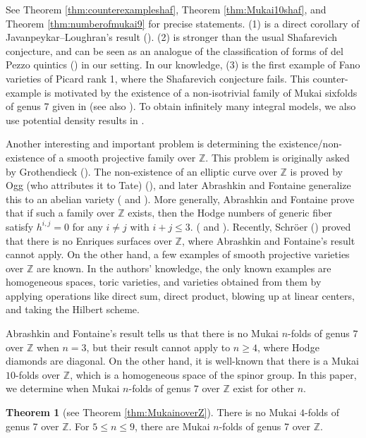 \documentclass[autodetect-engine, a4paper]{amsart}
\theoremstyle{definition}
\newtheorem{thm}{Theorem}[section]
\def\Z{{\mathbb Z}}
\begin{document}
See Theorem \ref{thm:counterexampleshaf}, Theorem \ref{thm:Mukai10shaf}, and Theorem \ref{thm:numberofmukai9} 
for precise statements.
(1) is a direct corollary of Javanpeykar--Loughran's result (\cite{Javanpeykar-Loughran:flag}).
(2) is stronger than the usual Shafarevich conjecture, and can be seen as an analogue of the classification of forms of del Pezzo quintics (\cite[Theorem 1]{DKM}) in our setting.
In our knowledge, (3) is the first example of Fano varieties of Picard rank 1, where the Shafarevich conjecture fails.
This counter-example is motivated by the existence of a non-isotrivial family of Mukai sixfolds of genus 7 given in \cite[Subsection 1.2]{Kuznetsovspinor} (see also \cite{mathoverflow}). To obtain infinitely many integral models, we also use potential density results in \cite{Hassett-Tschinkel}.

Another interesting and important problem is determining the existence/non-existence of a smooth projective family over $\Z$.
This problem is originally asked by Grothendieck (\cite[page 242]{Mazur}).
The non-existence of an elliptic curve over $\Z$ is proved by Ogg (who attributes it to Tate) (\cite{Ogg}), and later Abrashkin and Fontaine generalize this to an abelian variety (\cite{Abrashkinabelian} and \cite{Fontaineabelian}).
 More generally, Abrashkin and Fontaine prove that if such a family over $\Z$ exists, then the Hodge numbers of generic fiber satisfy $h^{i,j} =0$ for any $i\neq j$ with $i+j \leq 3$. (\cite{Abrashkin} and \cite{Fontaine}). 
 Recently, Schr\"{o}er (\cite{Schroer}) proved that there is no Enriques surfaces over $\Z$, where Abrashkin and Fontaine's result cannot apply.
 On the other hand, a few examples of smooth projective varieties over $\Z$ are known.
 In the authors' knowledge, the only known examples are homogeneous spaces, toric varieties, and varieties obtained from them by applying operations like direct sum, direct product, blowing up at linear centers, and taking the Hilbert scheme.

Abrashkin and Fontaine's result tells us that there is no Mukai $n$-folds of genus $7$ over $\Z$ when $n=3$, but their result cannot apply to $n\geq 4$, where Hodge diamonds are diagonal.
On the other hand, it is well-known that there is a Mukai $10$-folds over $\Z$, which is a homogeneous space of the spinor group.
In this paper, we determine when Mukai $n$-folds of genus $7$ over $\Z$ exist for other $n$. 

\begin{thm}[see Theorem \ref{thm:MukainoverZ}]
\label{thm:intromukainoverZ}
There is no Mukai $4$-folds of genus 7 over $\Z$.
For $5 \leq n \leq 9$, there are Mukai $n$-folds of genus 7 over $\Z$.
\end{thm}
\end{document}
